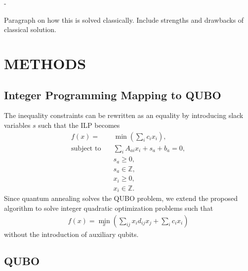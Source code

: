 -\documentclass[prd,twocolumn,tightenlines,preprintnumbers,showpacs,superscriptaddress,notitlepage,nofootinbib,eqsecnum,floatfix,longbibliography]{revtex4}
\begin{document}
{\color{red} Paragraph on how this is solved classically.
Include strengths and drawbacks of classical solution.}

\section{METHODS}
\label{sec:methods}

\subsection{Integer Programming Mapping to QUBO}
\label{sec:methods:ilp}

The inequality constraints can be rewritten as an equality by introducing slack variables $s$ such that the ILP becomes
{\color{blue}
\begin{align}
    f(x) = &\min(\sum_i c_i x_i),\\
    \textrm{subject to} \quad & \sum_i A_{a i}x_i + s_a + b_a = 0,\\
    & s_a \geq 0,\\
    & s_a \in \mathbb{Z},\\
    & x_i \geq 0,\\
    & x_i \in \mathbb{Z}.
\end{align}
}
Since quantum annealing solves the QUBO problem, we extend the proposed algorithm to solve integer quadratic optimization problems such that
{\color{blue}
\begin{align}
    f(x) = \min\limits_{x}(\sum_{ij} x_i d_{ij} x_j + \sum_i c_i x_i)
\end{align}
}
without the introduction of auxiliary qubits.

\subsection{QUBO}
\label{sec:methods:qubo}
\end{document}
